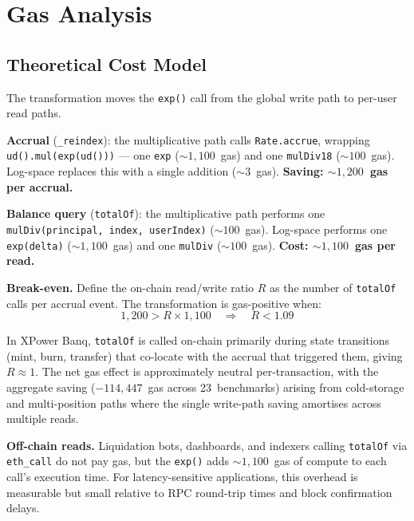\documentclass[10pt,a4paper,twocolumn]{article}
\begin{document}
\section{Gas Analysis}
\label{sec:gas}

\subsection{Theoretical Cost Model}
\label{subsec:gas-theory}

The transformation moves the \texttt{exp()} call from the global write path to per-user read paths.

\textbf{Accrual} (\texttt{\_reindex}): the multiplicative path calls \texttt{Rate.accrue}, wrapping \texttt{ud().mul(exp(ud()))} --- one \texttt{exp} (${\sim}1{,}100$~gas) and one \texttt{mulDiv18} (${\sim}100$~gas). Log-space replaces this with a single addition (${\sim}3$~gas). \textbf{Saving: ${\sim}1{,}200$~gas per accrual.}

\textbf{Balance query} (\texttt{totalOf}): the multiplicative path performs one \texttt{mulDiv(principal, index, userIndex)} (${\sim}100$~gas). Log-space performs one \texttt{exp(delta)} (${\sim}1{,}100$~gas) and one \texttt{mulDiv} (${\sim}100$~gas). \textbf{Cost: ${\sim}1{,}100$~gas per read.}

\textbf{Break-even.} Define the on-chain read/write ratio $R$ as the number of \texttt{totalOf} calls per accrual event. The transformation is gas-positive when:
\begin{equation}
\label{eq:breakeven}
1{,}200 > R \times 1{,}100 \quad \Longrightarrow \quad R < 1.09
\end{equation}

In XPower Banq, \texttt{totalOf} is called on-chain primarily during state transitions (mint, burn, transfer) that co-locate with the accrual that triggered them, giving $R \approx 1$. The net gas effect is approximately neutral per-transaction, with the aggregate saving ($-114{,}447$~gas across 23~benchmarks) arising from cold-storage and multi-position paths where the single write-path saving amortises across multiple reads.

\textbf{Off-chain reads.} Liquidation bots, dashboards, and indexers calling \texttt{totalOf} via \texttt{eth\_call} do not pay gas, but the \texttt{exp()} adds ${\sim}1{,}100$~gas of compute to each call's execution time. For latency-sensitive applications, this overhead is measurable but small relative to RPC round-trip times and block confirmation delays.
\end{document}
